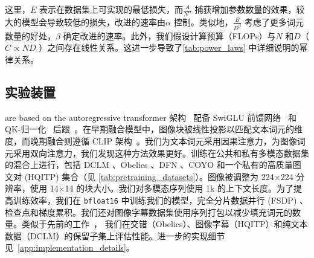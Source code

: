 \noindent 这里，\(E\) 表示在数据集上可实现的最低损失，而\(\frac{A}{N^{\alpha}}\) 捕获增加参数数量的效果，较大的模型会导致较低的损失，改进的速率由\(\alpha\) 控制。类似地，\(\frac{B}{D^{\beta}}\) 考虑了更多词元数量的好处，\(\beta\) 确定改进的速率。此外，我们假设计算预算（FLOPs）与\(N\) 和\(D\)（\(C \propto ND\) ）之间存在线性关系。这进一步导致了\cref{tab:power_laws} 中详细说明的幂律关系。


        

\begin{table}[h]
    \centering
    \setlength{\tabcolsep}{16pt}
    \renewcommand{\arraystretch}{1}
     \caption{\textbf{预训练数据混合。} 除非另有说明，训练混合物包含 45\%、45\% 和 10\% 的图像标题、交错文档和纯文本数据。}
    \label{tab:pretraining_datasets}
    \vspace{-5pt}
\end{table}

\subsection{实验装置}
 are based on the autoregressive transformer
架构~\citep{vaswani2017attention} 配备 SwiGLU
前馈网络~\citep{shazeer2020glu} 和 QK-归一化~\citep{dehghani2023scaling}
后跟~\citet{li2024datacomp}。在早期融合模型中，图像块被线性投影以匹配文本词元的维度，而晚期融合则遵循 CLIP 架构~\citep{radford2021learning}。我们为文本词元采用因果注意力，为图像词元采用双向注意力，我们发现这种方法效果更好。训练在公共和私有多模态数据集的混合上进行，包括 DCLM \citep{li2024datacomp}、Obelics
\citep{laurenccon2024obelics}、DFN \citep{fang2023data}、COYO
\citep{kakaobrain2022coyo700m} 和一个私有的高质量图文对 (HQITP) 集合（见 \cref{tab:pretraining_datasets}）。图像被调整为 224×224 分辨率，使用 14×14 的块大小。我们对多模态序列使用 1k 的上下文长度。为了提高训练效率，我们在 \texttt{bfloat16} 中训练我们的模型，完全分片数据并行 (FSDP)
\citep{zhao2023pytorch}、 检查点和梯度累积。我们还对图像字幕数据集使用序列打包以减少填充词元的数量。类似于先前的工作~\citep{hoffmann2022training,aghajanyan2023scalingmm,abnar2025parameters}，
我们在交错（Obelics）、图像字幕（HQITP）和纯文本数据（DCLM）的保留子集上评估性能。进一步的实现细节见~\cref{app:implementation_details}。
